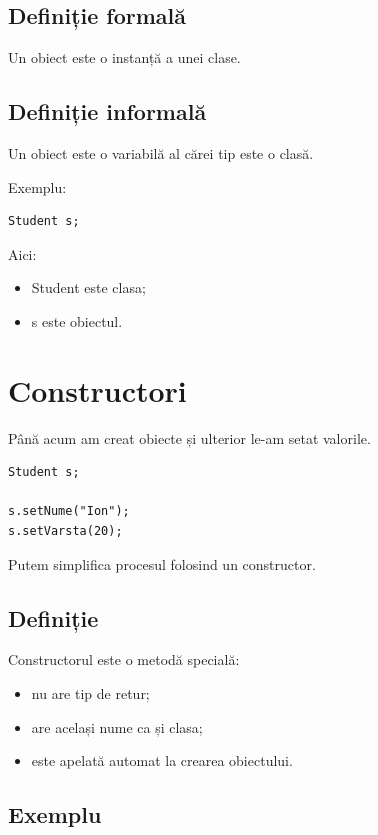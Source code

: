 \documentclass[12pt,a4paper]{article}
\begin{document}
\subsection*{Definiție formală}

Un obiect este o instanță a unei clase.

\subsection*{Definiție informală}

Un obiect este o variabilă al cărei tip este o clasă.

Exemplu:

\begin{lstlisting}
Student s;
\end{lstlisting}

Aici:

\begin{itemize}
    \item Student este clasa;
    \item s este obiectul.
\end{itemize}

\section{Constructori}

Până acum am creat obiecte și ulterior le-am setat valorile.

\begin{lstlisting}
Student s;

s.setNume("Ion");
s.setVarsta(20);
\end{lstlisting}

Putem simplifica procesul folosind un constructor.

\subsection*{Definiție}

Constructorul este o metodă specială:

\begin{itemize}
    \item nu are tip de retur;
    \item are același nume ca și clasa;
    \item este apelată automat la crearea obiectului.
\end{itemize}

\subsection*{Exemplu}
\end{document}
